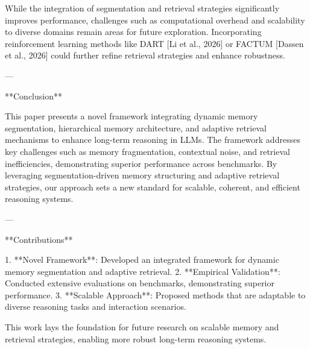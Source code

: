 While the integration of segmentation and retrieval strategies significantly improves performance, challenges such as computational overhead and scalability to diverse domains remain areas for future exploration. Incorporating reinforcement learning methods like DART [Li et al., 2026] or FACTUM [Dassen et al., 2026] could further refine retrieval strategies and enhance robustness.

---

**Conclusion**  

This paper presents a novel framework integrating dynamic memory segmentation, hierarchical memory architecture, and adaptive retrieval mechanisms to enhance long-term reasoning in LLMs. The framework addresses key challenges such as memory fragmentation, contextual noise, and retrieval inefficiencies, demonstrating superior performance across benchmarks. By leveraging segmentation-driven memory structuring and adaptive retrieval strategies, our approach sets a new standard for scalable, coherent, and efficient reasoning systems.  

---

**Contributions**  

1. **Novel Framework**: Developed an integrated framework for dynamic memory segmentation and adaptive retrieval.  
2. **Empirical Validation**: Conducted extensive evaluations on benchmarks, demonstrating superior performance.  
3. **Scalable Approach**: Proposed methods that are adaptable to diverse reasoning tasks and interaction scenarios.  

This work lays the foundation for future research on scalable memory and retrieval strategies, enabling more robust long-term reasoning systems.